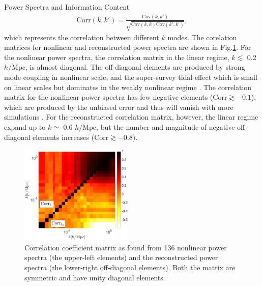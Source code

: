 \begin{section}{Power Spectra and Information Content}
\begin{align}
    \mathrm{Corr}\left(k,k'\right)=\frac{\mathrm{Cov}\left(k,k'\right)}{\sqrt{\mathrm{Cov}\left(k,k\right)\mathrm{Cov}\left(k',k'\right)}},
\end{align}
which represents the correlation between different $k$ modes. 
The corelation matrices for nonlinear and reconstructed power spectra 
are shown in Fig.\ref{fig:corrall}. For the nonlinear power spectra, the
correlation matrix in the linear regime, $k \lesssim$ 0.2 $h/\mathrm{Mpc}$, is almost diagonal. 
The off-diagonal elements are produced by 
strong mode coupling in nonlinear scale, and the super-survey tidal effect which is small on 
linear scales but dominates in the weakly nonlinear regime \cite{bib:Kazuyuki2016}.
The correlation matrix for the nonlinear power spectra has few negative elements
($\mathrm{Corr} \gtrsim -0.1$), which are produced by the unbiased error and thus 
 will vanish with more simulations \cite{bib:Takahashi2009}.
 For the reconstructed correlation matrix, however, the linear regime expand up to $k \simeq$ 0.6 $h/\mathrm{Mpc}$, 
but the number and magnitude of negative off-diagonal elements increases ($\mathrm{Corr} \gtrsim -0.8$). 

\begin{figure}
 \centering
  \includegraphics[width=0.48\textwidth]{corrmat_hot_2-crop.pdf}
  \caption{Correlation coefficient matrix as found from 136 nonlinear power spectra 
(the upper-left elements) and the reconstructed power spectra (the lower-right off-diagonal elements). 
Both the matrix are symmetric and have unity diagonal elements.}
    \label{fig:corrall}
\end{figure}



\end{section}
